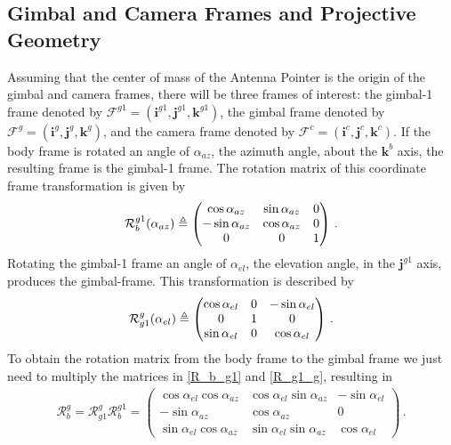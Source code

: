 \subsection{Gimbal and Camera Frames and Projective Geometry}{\label{sub:gimbal_camera_frames}}
Assuming that the center of mass of the Antenna Pointer is the origin of the gimbal and camera frames, there will be three frames of interest: the gimbal-1 frame denoted by  $\mathcal{F}^{g1}=(\boldsymbol{i}^{g1},\boldsymbol{j}^{g1},\boldsymbol{k}^{g1})$, the gimbal frame denoted by \linebreak $\mathcal{F}^g=(\boldsymbol{i}^g,\boldsymbol{j}^g,\boldsymbol{k}^g)$, and the camera frame denoted by $\mathcal{F}^c=(\boldsymbol{i}^c,\boldsymbol{j}^c,\boldsymbol{k}^c)$. If the body frame is rotated an angle of $\alpha_{az}$, the azimuth angle, about the $\boldsymbol{k}^b$ axis, the resulting frame is the gimbal-1 frame. The rotation matrix of this coordinate frame transformation is given by
\begin{align}{\label{R_b_g1}}
\mathcal{R}_b^{g1}(\alpha_{az})\triangleq
\begin{pmatrix}
\cos\alpha_{az}  & \sin\alpha_{az} & 0 \\
-\sin\alpha_{az} & \cos\alpha_{az} & 0 \\
0				 & 0			   & 1
\end{pmatrix}\,.
\end{align}
Rotating the gimbal-1 frame an angle of $\alpha_{el}$, the elevation angle, in the $\boldsymbol{j}^{g1}$ axis, produces the gimbal-frame. This transformation is described by
\begin{align}{\label{R_g1_g}}
\mathcal{R}^g_{g1}(\alpha_{el})\triangleq
\begin{pmatrix}
\cos\alpha_{el} & 0 & -\sin\alpha_{el} \\
0				& 1 & 0				   \\
\sin\alpha_{el} & 0 & \cos\alpha_{el}
\end{pmatrix}\,.
\end{align} 
To obtain the rotation matrix from the body frame to the gimbal frame we just need to multiply the matrices in \ref{R_b_g1} and \ref{R_g1_g}, resulting in
\begin{align}
\mathcal{R}^g_{b}=\mathcal{R}^g_{g1}\mathcal{R}^{g1}_b=
\begin{pmatrix}
\cos\alpha_{el}\cos\alpha_{az} & \cos\alpha_{el}\sin\alpha_{az} & -\sin\alpha_{el} \\
-\sin\alpha_{az} 			   & \cos\alpha_{az} 			  	& 0 			   \\
\sin\alpha_{el}\cos\alpha_{az} & \sin\alpha_{el}\sin\alpha_{az} & \cos\alpha_{el}
\end{pmatrix}\,.
\end{align}

